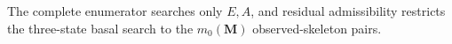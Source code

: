 The complete enumerator searches only \(E,A\), and residual admissibility restricts the three-state basal search to the \(m_0(\mathbf M)\) observed-skeleton pairs.